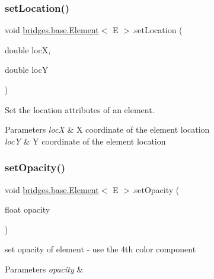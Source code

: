 \subsubsection{\texorpdfstring{setLocation()}{setLocation()}}
{\footnotesize\ttfamily void \mbox{\hyperlink{classbridges_1_1base_1_1_element}{bridges.\+base.\+Element}}$<$ E $>$.set\+Location (\begin{DoxyParamCaption}\item[{double}]{locX,  }\item[{double}]{locY }\end{DoxyParamCaption})}

Set the location attributes of an element.


\begin{DoxyParams}{Parameters}
{\em locX} & X coordinate of the element location \\
\hline
{\em locY} & Y coordinate of the element location \\
\hline
\end{DoxyParams}
\mbox{\label{classbridges_1_1base_1_1_element_a71c622f2cbb03b086c5a8f80d390b366}} 
\subsubsection{\texorpdfstring{setOpacity()}{setOpacity()}}
{\footnotesize\ttfamily void \mbox{\hyperlink{classbridges_1_1base_1_1_element}{bridges.\+base.\+Element}}$<$ E $>$.set\+Opacity (\begin{DoxyParamCaption}\item[{float}]{opacity }\end{DoxyParamCaption})}

set opacity of element -\/ use the 4th color component


\begin{DoxyParams}{Parameters}
{\em opacity} & \\
\hline
\end{DoxyParams}
\mbox{\label{classbridges_1_1base_1_1_element_ae65bfb47628e028c21c43553ef59b7a2}} 
